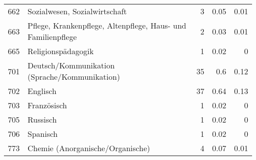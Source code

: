 \begin{longtable}{lXrrr}
        662 & \multicolumn{1}{X}{Sozialwesen, Sozialwirtschaft} & %
          \num{3} &
          \num[round-mode=places,round-precision=2]{0.05} &
          \num[round-mode=places,round-precision=2]{0.01} \\

        663 & \multicolumn{1}{X}{Pflege, Krankenpflege, Altenpflege, Haus- und Familienpflege} & %
          \num{2} &
          \num[round-mode=places,round-precision=2]{0.03} &
          \num[round-mode=places,round-precision=2]{0.01} \\

        665 & \multicolumn{1}{X}{Religionspädagogik} & %
          \num{1} &
          \num[round-mode=places,round-precision=2]{0.02} &
          \num[round-mode=places,round-precision=2]{0} \\

        701 & \multicolumn{1}{X}{Deutsch/Kommunikation (Sprache/Kommunikation)} & %
          \num{35} &
          \num[round-mode=places,round-precision=2]{0.6} &
          \num[round-mode=places,round-precision=2]{0.12} \\

        702 & \multicolumn{1}{X}{Englisch} & %
          \num{37} &
          \num[round-mode=places,round-precision=2]{0.64} &
          \num[round-mode=places,round-precision=2]{0.13} \\

        703 & \multicolumn{1}{X}{Französisch} & %
          \num{1} &
          \num[round-mode=places,round-precision=2]{0.02} &
          \num[round-mode=places,round-precision=2]{0} \\

        705 & \multicolumn{1}{X}{Russisch} & %
          \num{1} &
          \num[round-mode=places,round-precision=2]{0.02} &
          \num[round-mode=places,round-precision=2]{0} \\

        706 & \multicolumn{1}{X}{Spanisch} & %
          \num{1} &
          \num[round-mode=places,round-precision=2]{0.02} &
          \num[round-mode=places,round-precision=2]{0} \\

        773 & \multicolumn{1}{X}{Chemie (Anorganische/Organische)} & %
          \num{4} &
          \num[round-mode=places,round-precision=2]{0.07} &
          \num[round-mode=places,round-precision=2]{0.01} \\


\end{longtable}

